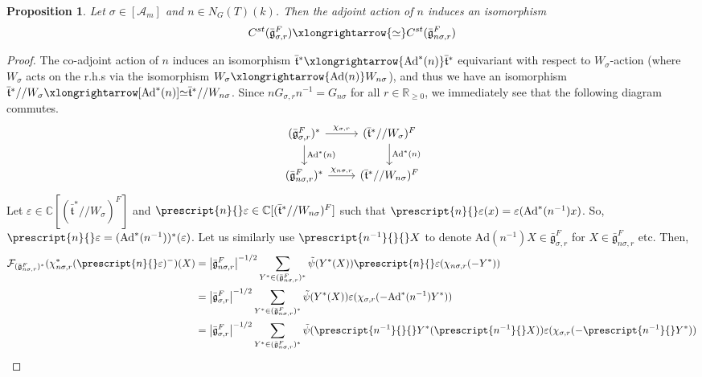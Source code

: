 \documentclass[11 pt]{article}
\numberwithin{equation}{subsection}
\newtheorem{proposition}[theorem]{Proposition}
\theoremstyle{definition}
\theoremstyle{remark}
\theoremstyle{conjecture}
\newcommand{\sA}{\mathscr A}
\newcommand{\bt}{\bar{\mathfrak t}}
\newcommand{\bg}{\bar{\mathfrak g}}
\newcommand{\Ad}{\mathrm{Ad}}
\newcommand{\R}{\mathbb R}
\newcommand{\C}{\mathbb C}
\newcommand{\mcF}{\mathcal F}
\begin{document}
\begin{proposition}
    Let $\sigma \in [\sA_m]$ and $n \in N_G(T)(k)$. Then the adjoint action of $n$ induces an isomorphism 
    \begin{equation*}
         C^{st}(\bg_{\sigma,r}^F) \xlongrightarrow{\simeq}  C^{st}(\bg_{n\sigma,r}^F)  
    \end{equation*}
\end{proposition}
\begin{proof}
   The co-adjoint action of $n$ induces an isomorphism $\bt^*\xlongrightarrow{\Ad^*(n)}\bt^*$ equivariant with respect to $W_\sigma$-action (where $W_\sigma$ acts on the r.h.s via the isomorphism  $W_\sigma \xlongrightarrow{\Ad(n)} W_{n\sigma}$), and thus we have an isomorphism $\bt^*//W_\sigma \xlongrightarrow[\Ad^*(n)]{\simeq}\bt^*//W_{n\sigma}$. Since $nG_{\sigma,r}n^{-1}=G_{n\sigma}$ for all $r \in \R_{\geq 0}$, we immediately see that the following diagram commutes. 
    \begin{equation*}
        \begin{tikzcd}
           (\bg_{\sigma,r}^F)^* \arrow{r}{\chi_{\sigma,r}} \arrow{d}{\Ad^*(n)}&(\bt^*//W_\sigma)^F \arrow{d}{\Ad^*(n)}\\
          (\bg_{n\sigma,r}^F)^* \arrow{r}{\chi_{n\sigma,r}} &(\bt^*//W_{n\sigma})^F
        \end{tikzcd}
    \end{equation*}
    Let  $\varepsilon \in \C[(\bt^*//W_\sigma)^F]$ and $\prescript{n}{}\varepsilon \in \C[(\bt^*//W_{n\sigma})^F]$ such that $\prescript{n}{}\varepsilon(x)=\varepsilon(\Ad^*(n^{-1})x)$. So, $\prescript{n}{}\varepsilon=(\Ad^*(n^{-1}))^*(\varepsilon)$.  Let us similarly use $ \prescript{n^{-1}}{}{}X$ to denote $\Ad(n^{-1})X \in \bg_{\sigma,r}^F$ for $X \in \bg_{n\sigma,r}^F$ etc. Then, 
    \begin{align*}
        \mcF_{(\bg_{n\sigma,r}^F)^*}(\chi_{n\sigma,r}^*(\prescript{n}{}\varepsilon)^-)(X)
        &= \left|\bg_{n\sigma,r}^F\right|^{-1/2}\sum_{Y^*\in (\bg_{n\sigma,r}^F)^*}\Tilde{\psi}(Y^*(X))\prescript{n}{}\varepsilon(\chi_{n\sigma,r}(-Y^*))\\
        &=\left|\bg_{\sigma,r}^F\right|^{-1/2}\sum_{Y^*\in (\bg_{n\sigma,r}^F)^*}\Tilde{\psi}(Y^*(X))\varepsilon(\chi_{\sigma,r}(-\Ad^*(n^{-1})Y^*))\\
        &=\left|\bg_{\sigma,r}^F\right|^{-1/2}\sum_{Y^*\in (\bg_{n\sigma,r}^F)^*}\Tilde{\psi}(\prescript{n^{-1}}{}{}Y^*(\prescript{n^{-1}}{}X))\varepsilon(\chi_{\sigma,r}(-\prescript{n^{-1}}{}Y^*))\\

\end{align*}
\end{proof}
\end{document}
